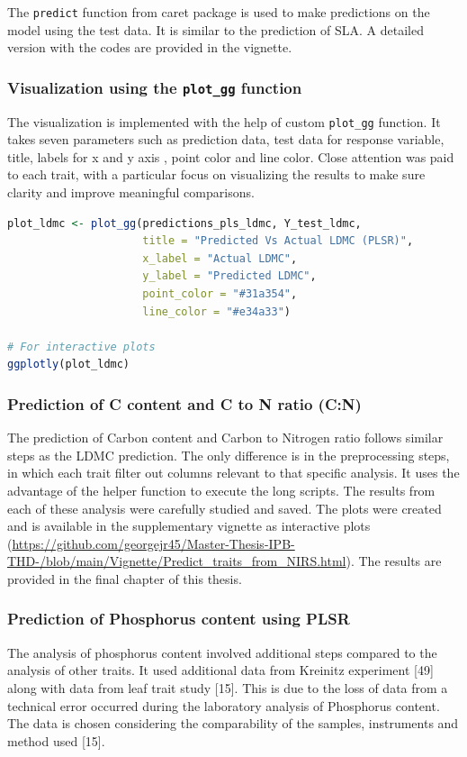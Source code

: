 \documentclass[12pt,a4paper]{report}
\begin{document}
The \texttt{predict} function from caret package is used to make predictions on the model using the test data. It is similar to the prediction of SLA. A detailed version with the codes are provided in the vignette. \\


\subsubsection*{Visualization using the \texttt{plot\_gg} function}
The visualization is implemented with the help of custom \texttt{plot\_gg} function. It takes seven parameters such as prediction data, test data for response variable, title, labels for x and y axis , point color and line color. Close attention was paid to each trait, with a particular focus on visualizing the results to make sure clarity and improve meaningful comparisons. \\

\begin{lstlisting}[language=R, style=mystyle]
plot_ldmc <- plot_gg(predictions_pls_ldmc, Y_test_ldmc,
                     title = "Predicted Vs Actual LDMC (PLSR)",
                     x_label = "Actual LDMC",
                     y_label = "Predicted LDMC",
                     point_color = "#31a354",
                     line_color = "#e34a33")

# For interactive plots
ggplotly(plot_ldmc)
\end{lstlisting}

\subsubsection*{Prediction of C content and C to N ratio (C:N)}
The prediction of Carbon content and Carbon to Nitrogen ratio follows similar steps as the LDMC prediction. The only difference is in the preprocessing steps, in which each trait filter out columns relevant to that specific analysis. It uses the advantage of the helper function to execute the long scripts. The results from each of these analysis were carefully studied and saved. The plots were created and is available in the supplementary vignette as interactive plots (\url{https://github.com/georgejr45/Master-Thesis-IPB-THD-/blob/main/Vignette/Predict_traits_from_NIRS.html}). The results are provided in the final chapter of this thesis.

\subsubsection*{Prediction of Phosphorus content using PLSR}
The analysis of phosphorus content involved additional steps compared to the analysis of other traits. It used additional data from Kreinitz experiment [49] along with data from leaf trait study [15]. This is due to the loss of data from a technical error occurred during the laboratory analysis of Phosphorus content. The data is chosen considering the comparability of the samples, instruments and method used [15]. \\
\end{document}
